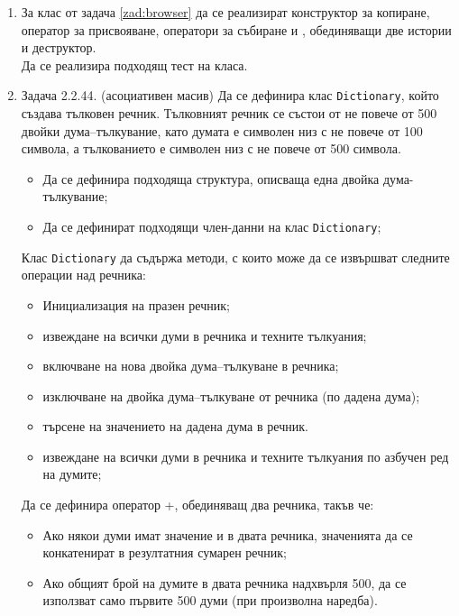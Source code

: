 \begin{enumerate}[resume]

  \item За клас  от задача \ref{zad:browser} да се реализират конструктор за копиране, оператор за присвояване, оператори за събиране \code{+} и \code{+=}, обединяващи две истории и деструктор.\\

  Да се реализира подходящ тест на класа.

  \item Задача 2.2.44. (асоциативен масив) \cite{sbornik2}\label{zad:dict1} Да се дефинира клас \texttt{Dictionary}, който създава тълковен речник. Тълковният речник се състои от не повече от 500 двойки дума–тълкувание, като думата е символен низ с не повече от 100 символа, а тълкованието е символен низ с не повече от 500 символа.

  \begin{itemize}
  	\item Да се дефинира подходяща структура, описваща една двойка дума-тълкувание;
  	\item Да се дефинират подходящи член-данни на клас \texttt{Dictionary};
  \end{itemize}

  Клас \texttt{Dictionary} да съдържа методи, с които може да се извършват следните операции над речника:

  \begin{itemize}

  \item Инициализация на празен речник;
  \item извеждане на всички думи в речника и техните тълкуания;
  \item включване на нова двойка дума–тълкуване в речника;
  \item изключване на двойка дума–тълкуване от речника (по дадена дума);
  \item търсене на значението на дадена дума в речник.
  \item извеждане на всички думи в речника и техните тълкуания по азбучен ред на думите;
  \end{itemize}

  Да се дефинира оператор +, обединяващ два речника, такъв че:

  \begin{itemize}
   \item Ако някои думи имат значение и в двата речника, значенията да се конкатенират в резултатния сумарен речник;
   \item Ако общият брой на думите в двата речника надхвърля 500, да се използват само първите 500 думи (при произволна наредба).
  \end{itemize}



\end{enumerate}
